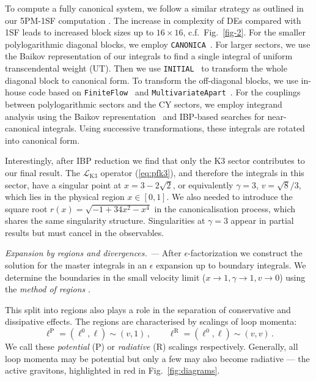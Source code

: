 \documentclass[twocolumn,superscriptaddress,amsmath, amssymb, amsfonts,preprintnumbers,aps,prd,longbibliography,nofootinbib]{revtex4-2}
\renewcommand{\sec}[1]{\textit{#1. --- }}
\newcommand*\Bell{\ensuremath{\boldsymbol\ell}}
\begin{document}
To compute a fully canonical system, we follow a similar strategy as outlined in our 5PM-1SF computation \cite{Driesse:2024feo}. The increase in complexity of DEs compared with 1SF leads to increased block sizes up to $16\times 16$, c.f.~Fig.~\ref{fig-2}.
For the smaller polylogarithmic diagonal blocks, we employ \texttt{CANONICA}~\cite{Meyer:2017joq}.
For larger sectors, we use the Baikov representation of our integrals \cite{Frellesvig:2024ymq} to find a single integral of uniform transcendental weight (UT). Then we use \texttt{INITIAL}~\cite{Dlapa:2020cwj} to transform the whole diagonal block to canonical form.
To transform the off-diagonal blocks,
we use in-house code based on \texttt{FiniteFlow}~\cite{Peraro:2019svx}
and \texttt{MultivariateApart}~\cite{Heller:2021qkz}.
For the couplings between polylogarithmic sectors and the CY sectors, we employ integrand analysis using the Baikov representation~\cite{Frellesvig:2024ymq} and IBP-based searches for near-canonical integrals. Using successive transformations, these integrals are rotated into canonical form.

Interestingly, after IBP reduction we find that
only the K3 sector contributes to our final result.
The $\mathcal{L}_\text{K3}$ operator (\ref{eq:pfk3}),
and therefore the integrals in this sector, have a singular point at $x=3-2 \sqrt{2}$,
or equivalently $\gamma=3$, $v=\sqrt{8}/3$, which lies in the physical region $x \in [0, 1]$.
We also needed to introduce the square root $r(x)=\sqrt{-1+34x^2-x^4}$ in the canonicalisation process, which shares the same singularity structure. Singularities at $\gamma=3$ appear in partial results but must cancel in the observables.




\sec{Expansion by regions and divergences}
After $\epsilon$-factorization we construct the solution for the master integrals
in an $\epsilon$ expansion up to boundary integrals. We determine the boundaries in the small velocity limit ($x \rightarrow 1, \gamma\rightarrow1, v\rightarrow 0$) using the  \emph{method of regions} \cite{Beneke:1997zp, Smirnov:2012gma, Becher:2014oda}.

  This split into regions also plays a role in the separation of conservative and dissipative effects.
  The regions are characterised by scalings of loop momenta:
\begin{equation}\label{PRregions}
	  \ell^\text{P}=(\ell^0,\Bell)\sim(v,1)\,,  \qquad
 	  \ell^\text{R}=(\ell^0,\Bell)\sim(v,v) \, .
\end{equation}
We call these \emph{potential} (P) or \emph{radiative} (R) scalings respectively.
Generally, all loop momenta may be potential but only a few may also become radiative ---
the active gravitons, highlighted in red in Fig.~\ref{fig:diagrams}.
\end{document}
